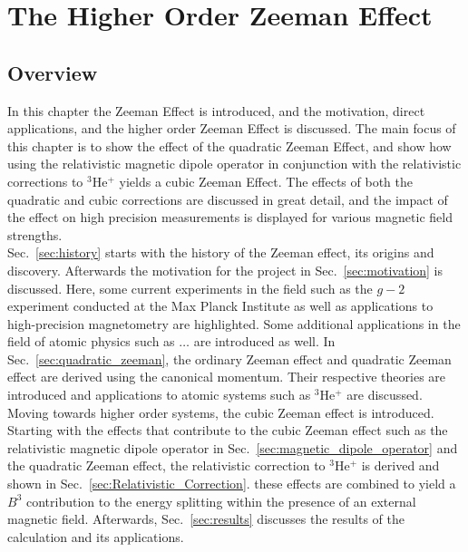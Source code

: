 \chapter{The Higher Order Zeeman Effect}\label{sec:Zeeman-Effect}
    \section{Overview}
        In this chapter the Zeeman Effect is introduced, and the motivation, direct applications, and the higher order Zeeman Effect is discussed. The main focus of this chapter is to show the effect of the quadratic Zeeman Effect, and show how using the relativistic magnetic dipole operator in conjunction with the relativistic corrections to $^3$He$^+$ yields a cubic Zeeman Effect. The effects of both the quadratic and cubic corrections are discussed in great detail, and the impact of the effect on high precision measurements is displayed for various magnetic field strengths.\\

       Sec.~\ref{sec:history} starts with the history of the Zeeman effect, its origins and discovery. Afterwards the motivation for the project in Sec.~\ref{sec:motivation} is discussed. Here, some current experiments in the field such as the $g-2$ experiment conducted at the Max Planck Institute as well as applications to high-precision magnetometry are highlighted. Some additional applications in the field of atomic physics such as $\dots$ are introduced as well. In Sec.~\ref{sec:quadratic_zeeman}, the ordinary Zeeman effect and quadratic Zeeman effect are derived using the canonical momentum. Their respective theories are introduced and applications to atomic systems such as $^3$He$^+$ are discussed. Moving towards higher order systems, the cubic Zeeman effect is introduced. Starting with the effects that contribute to the cubic Zeeman effect such as the relativistic magnetic dipole operator in Sec.~\ref{sec:magnetic_dipole_operator} and the quadratic Zeeman effect, the relativistic correction to $^3$He$^+$ is derived and shown in Sec.~\ref{sec:Relativistic_Correction}. these effects are combined to yield a $B^3$ contribution to the energy splitting within the presence of an external magnetic field. Afterwards, Sec.~\ref{sec:results} discusses the results of the calculation and its applications.

